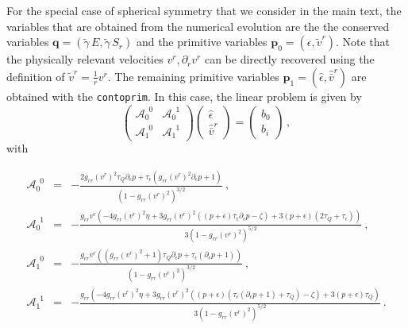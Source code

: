 \documentclass[prd,aps,twocolumn,floats,floatfix,nofootinbib,superscriptaddress] {revtex4-1}
\begin{document}
For the special case of spherical symmetry that we consider in the main text, the variables that are obtained from the numerical evolution are the the conserved variables $\mathbf{q}=(\tilde{\gamma}\,E,\tilde{\gamma}\,S_{r})$ and the primitive variables $\mathbf{p}_0=(\epsilon,\tilde{v}^r).$ Note that the physically relevant velocities $v^r, \partial_r v^r$ can be directly recovered using the definition of $\tilde{v}^r= \tfrac{1}{r}v^{r}$. The remaining primitive variables $\mathbf{p}_1=(\hat{\epsilon},\hat{\bar v}^r)$ are obtained with the \verb|contoprim|. In this case, the linear problem is given by
\begin{equation}
 \left(
\begin{array}{cc}
\mathcal{A}_{0}^{\phantom{0}0} & \mathcal{A}_{0}^{\phantom{0}1} \\
\mathcal{A}_{1}^{\phantom{0}0} & \mathcal{A}_{1}^{\phantom{0}1}
\end{array}
\right)
\left(
\begin{array}{c}
\hat\epsilon \\
\hat{\bar v}^r
\end{array}
\right) =
\left(
\begin{array}{c}
b_0 \\
b_i
\end{array}
\right)\,,
\end{equation}
with
\begin{widetext}
\begin{eqnarray*}
    \mathcal{A}_{0}^{\phantom{0}0} &=& -\frac{2 g_{rr} (v^r)^2 \tau_Q \partial_\epsilon p+\tau_\epsilon \left(g_{rr}
   (v^r)^2 \partial_\epsilon p+1\right)}{\left(1-g_{rr} (v^r)^2\right)^{3/2}}~,\\
    \mathcal{A}_{0}^{\phantom{0}1} &=& -\frac{g_{rr} v^r \left(-4 g_{rr} (v^r)^2 \eta+3 g_{rr} (v^r)^2 \left((p+\epsilon) \tau_\epsilon \partial_\epsilon p-\zeta\right)+3 (p+\epsilon) (2
   \tau_Q+\tau_\epsilon)\right)}{3 \left(1-g_{rr} (v^r)^2\right)^{5/2}}~,\\
   \mathcal{A}_{1}^{\phantom{0}0} &=& -\frac{g_{rr} v^r \left(\left(g_{rr} (v^r)^2+1\right) \tau_Q \partial_\epsilon p+\tau_\epsilon \left(\partial_\epsilon p+1\right)\right)}{\left(1-g_{rr} (v^r)^2\right)^{3/2}}~,\\
   \mathcal{A}_{1}^{\phantom{0}1} &=& -\frac{g_{rr} \left(-4 g_{rr} (v^r)^2 \eta +3 g_{rr} (v^r)^2 \left((p+\epsilon
   ) \left(\tau_\epsilon \left(\partial_\epsilon p+1\right)+\tau_Q\right)-\zeta \right)+3
   (p+\epsilon) \tau_Q\right)}{3 \left(1-g_{rr} (v^r)^2\right)^{5/2}}~.
\end{eqnarray*}
\end{widetext}
\end{document}
